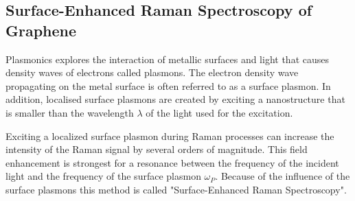 \subsection{Surface-Enhanced Raman Spectroscopy of Graphene}

Plasmonics explores the interaction of metallic surfaces and light that causes density waves of electrons called plasmons. The electron density wave propagating on the metal surface is often referred to as a surface plasmon. In addition, localised surface plasmons are created by exciting a nanostructure that is smaller than the wavelength $\lambda$ of the light used for the excitation\cite{maier2007}.

Exciting a localized surface plasmon during Raman processes can increase the intensity of the Raman signal by several orders of magnitude\cite{maier2007}. This field enhancement is strongest for a resonance between the frequency of the incident light and the frequency of the surface plasmon $\omega_P$. Because of the influence of the surface plasmons this method is called "Surface-Enhanced Raman Spectroscopy".

